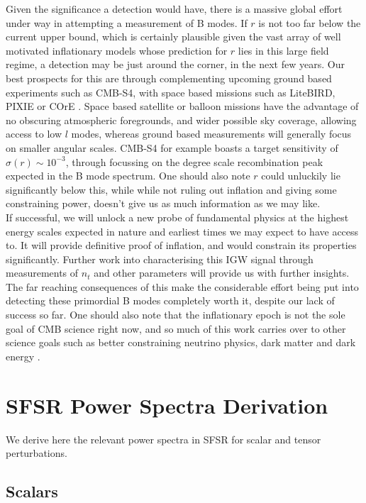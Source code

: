 \documentclass[a4paper,10pt]{article}
\begin{document}
Given the significance a detection would have, there is a massive global effort under way in attempting a measurement of B modes. If $r$ is not too far below the current upper bound, which is certainly plausible given the vast array of well motivated inflationary models whose prediction for $r$ lies in this large field regime, a detection may be just around the corner, in the next few years. Our best prospects for this are through complementing upcoming ground based experiments such as CMB-S4, with space based missions such as LiteBIRD, PIXIE or COrE \cite{S4}. Space based satellite or balloon missions have the advantage of no obscuring atmospheric foregrounds, and wider possible sky coverage, allowing access to low $l$ modes, whereas ground based measurements will generally focus on smaller angular scales. CMB-S4 for example boasts a target sensitivity of $\sigma(r) \sim 10^{-3}$, through focussing on the degree scale recombination peak expected in the B mode spectrum. One should also note $r$ could unluckily lie significantly below this, while while not ruling out inflation and giving some constraining power, doesn't give us as much information as we may like.\\

If successful, we will unlock a new probe of fundamental physics at the highest energy scales expected in nature and earliest times we may expect to have access to. It will provide definitive proof of inflation, and would constrain its properties significantly. Further work into characterising this IGW signal through measurements of $n_t$ and other parameters will provide us with further insights. The far reaching consequences of this make the considerable effort being put into detecting these primordial B modes completely worth it, despite our lack of success so far. One should also note that the inflationary epoch is not the sole goal of CMB science right now, and so much of this work carries over to other science goals such as better constraining neutrino physics, dark matter and dark energy \cite{S4}.




\appendix
\newpage

\section{SFSR Power Spectra Derivation}
\label{SFSRderivation}

We derive here the relevant power spectra in SFSR for scalar and tensor perturbations.
\subsection{Scalars}
\end{document}
